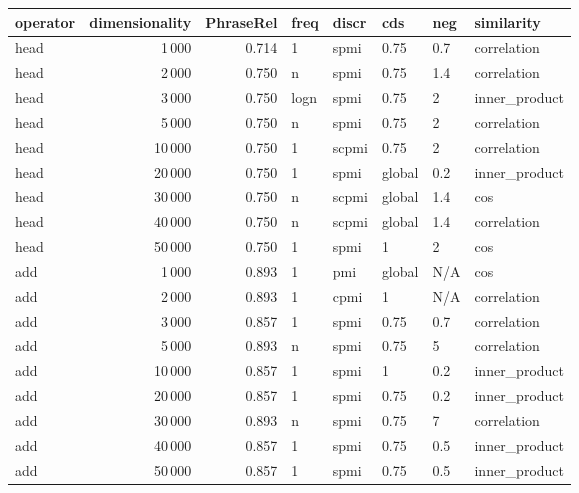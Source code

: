 \begin{tabular}{lrrlllll}
\toprule
operator &  dimensionality &  PhraseRel &  freq &  discr &     cds &  neg &     similarity \\
\midrule
    head &            1\,000 &      0.714 &     1 &   spmi &    0.75 &  0.7 &    correlation \\
    head &            2\,000 &      0.750 &     n &   spmi &    0.75 &  1.4 &    correlation \\
    head &            3\,000 &      0.750 &  logn &   spmi &    0.75 &    2 &  inner\_product \\
    head &            5\,000 &      0.750 &     n &   spmi &    0.75 &    2 &    correlation \\
    head &           10\,000 &      0.750 &     1 &  scpmi &    0.75 &    2 &    correlation \\
    head &           20\,000 &      0.750 &     1 &   spmi &  global &  0.2 &  inner\_product \\
    head &           30\,000 &      0.750 &     n &  scpmi &  global &  1.4 &            cos \\
    head &           40\,000 &      0.750 &     n &  scpmi &  global &  1.4 &    correlation \\
    head &           50\,000 &      0.750 &     1 &   spmi &       1 &    2 &            cos \\
     add &            1\,000 &      0.893 &     1 &    pmi &  global &  N/A &            cos \\
     add &            2\,000 &      0.893 &     1 &   cpmi &       1 &  N/A &    correlation \\
     add &            3\,000 &      0.857 &     1 &   spmi &    0.75 &  0.7 &    correlation \\
     add &            5\,000 &      0.893 &     n &   spmi &    0.75 &    5 &    correlation \\
     add &           10\,000 &      0.857 &     1 &   spmi &       1 &  0.2 &  inner\_product \\
     add &           20\,000 &      0.857 &     1 &   spmi &    0.75 &  0.2 &  inner\_product \\
     add &           30\,000 &      0.893 &     n &   spmi &    0.75 &    7 &    correlation \\
     add &           40\,000 &      0.857 &     1 &   spmi &    0.75 &  0.5 &  inner\_product \\
     add &           50\,000 &      0.857 &     1 &   spmi &    0.75 &  0.5 &  inner\_product \\

\end{tabular}
